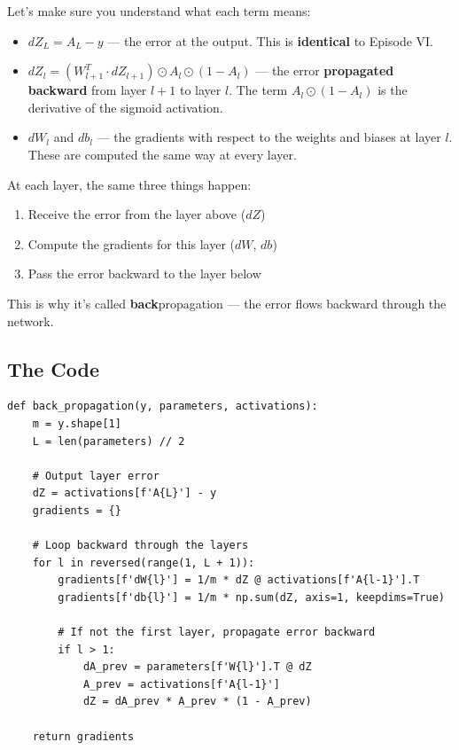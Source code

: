 \documentclass[11pt]{article}
\begin{document}
Let's make sure you understand what each term means:

\begin{itemize}
  \item $dZ_L = A_L - y$ --- the error at the output. This is \textbf{identical} to Episode VI.
  \item $dZ_l = (W_{l+1}^T \cdot dZ_{l+1}) \odot A_l \odot (1 - A_l)$ --- the error \textbf{propagated backward} from layer $l+1$ to layer $l$. The term $A_l \odot (1 - A_l)$ is the derivative of the sigmoid activation.
  \item $dW_l$ and $db_l$ --- the gradients with respect to the weights and biases at layer $l$. These are computed the same way at every layer.
\end{itemize}

\begin{insightbox}[title=The Pattern]
At each layer, the same three things happen:
\begin{enumerate}
  \item Receive the error from the layer above ($dZ$)
  \item Compute the gradients for this layer ($dW$, $db$)
  \item Pass the error backward to the layer below
\end{enumerate}
This is why it's called \textbf{back}propagation --- the error flows backward through the network.
\end{insightbox}

\subsection{The Code}

\begin{lstlisting}[title={\small Generalized Backpropagation}]
def back_propagation(y, parameters, activations):
    m = y.shape[1]
    L = len(parameters) // 2

    # Output layer error
    dZ = activations[f'A{L}'] - y
    gradients = {}

    # Loop backward through the layers
    for l in reversed(range(1, L + 1)):
        gradients[f'dW{l}'] = 1/m * dZ @ activations[f'A{l-1}'].T
        gradients[f'db{l}'] = 1/m * np.sum(dZ, axis=1, keepdims=True)

        # If not the first layer, propagate error backward
        if l > 1:
            dA_prev = parameters[f'W{l}'].T @ dZ
            A_prev = activations[f'A{l-1}']
            dZ = dA_prev * A_prev * (1 - A_prev)

    return gradients
\end{lstlisting}
\end{document}
